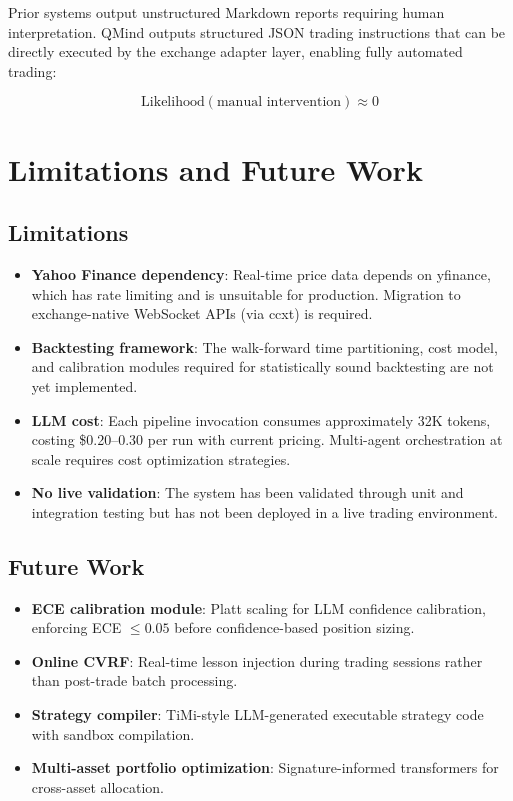 \documentclass[twocolumn]{article}
\begin{document}
Prior systems\cite{tradingagents2024,finrobot2024cot} output unstructured Markdown reports requiring human interpretation. QMind outputs structured JSON trading instructions that can be directly executed by the exchange adapter layer, enabling fully automated trading:

\begin{equation}
\text{Likelihood}(\text{manual intervention}) \approx 0
\end{equation}

\section{Limitations and Future Work}

\subsection{Limitations}

\begin{itemize}
    \item \textbf{Yahoo Finance dependency}: Real-time price data depends on yfinance, which has rate limiting and is unsuitable for production. Migration to exchange-native WebSocket APIs (via ccxt) is required.
    \item \textbf{Backtesting framework}: The walk-forward time partitioning, cost model, and calibration modules required for statistically sound backtesting are not yet implemented.
    \item \textbf{LLM cost}: Each pipeline invocation consumes approximately 32K tokens, costing \$0.20--0.30 per run with current pricing. Multi-agent orchestration at scale requires cost optimization strategies.
    \item \textbf{No live validation}: The system has been validated through unit and integration testing but has not been deployed in a live trading environment.
\end{itemize}

\subsection{Future Work}

\begin{itemize}
    \item \textbf{ECE calibration module}: Platt scaling for LLM confidence calibration, enforcing ECE $\leq 0.05$ before confidence-based position sizing.
    \item \textbf{Online CVRF}: Real-time lesson injection during trading sessions rather than post-trade batch processing.
    \item \textbf{Strategy compiler}: TiMi-style\cite{timi2025} LLM-generated executable strategy code with sandbox compilation.
    \item \textbf{Multi-asset portfolio optimization}: Signature-informed transformers for cross-asset allocation\cite{signature2025}.
\end{itemize}
\end{document}
